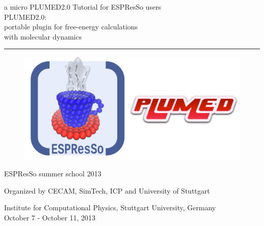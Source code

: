 \documentclass[10pt,fleqn,a4paper]{report}
\begin{document}
\begin{titlepage}
\vspace{4cm}
\begin{flushleft}
{
 {    \Large{a micro  PLUMED2.0 Tutorial for ESPResSo users}} \\ \vspace{.5cm}
 {   \selectfont \Large{PLUMED2.0: \\ portable plugin for free-energy calculations \\ with  molecular dynamics}}
}
\rule{12cm}{4pt}
\end{flushleft}
\vspace{1cm}
\begin{figure}[here!]
\begin{center}
\includegraphics[width=15cm,angle=0]{./figures/logo}
\end{center}
\end{figure}
\vspace{1cm}
\begin{flushright}
    \large{
 ESPResSo summer school 2013
 } \\ 
 \vspace{1cm}

    \large{Organized by CECAM, SimTech, ICP and University of Stuttgart} \\
\vspace{1cm}
 
    \large{Institute for Computational Physics, Stuttgart University, Germany} \\
    \large{October 7 - October 11, 2013}
\end{flushright}



\end{titlepage}
\end{document}
